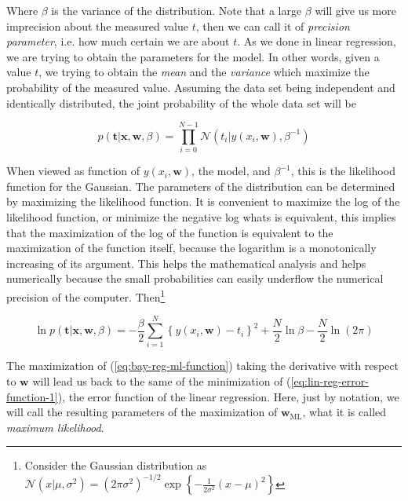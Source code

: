 \documentclass[11pt]{article} %
\begin{document}
Where $\beta$ is the variance of the distribution. Note that a large $\beta$ will give us more imprecision about the measured value $t$, then we can call it of \textit{precision parameter}, i.e. how much certain we are about $t$. As we done in linear regression, we are trying to obtain the parameters for the model. In other words, given a value $t$, we trying to obtain the \textit{mean} and the \textit{variance} which maximize the probability of the measured value. Assuming the data set being independent and identically distributed, the joint probability of the whole data set will be

\begin{equation}
   p(\mathbf{t} | \mathbf{x}, \mathbf{w}, \beta)= \prod_{i=0}^{N-1} \mathcal{N}\left(t_i | y(x_i, \mathbf{w}), \beta^{-1}\right)
\end{equation}

When viewed as function of $y(x_i, \mathbf{w})$, the model, and $\beta^{-1}$, this is the likelihood function for the Gaussian. The parameters of the distribution can be determined by maximizing the likelihood function. It is convenient to maximize the log of the likelihood function, or minimize the negative log whats is equivalent, this implies that the maximization of the log of the function is equivalent to the maximization of the function itself, because the logarithm is a monotonically increasing of its argument. This helps the mathematical analysis and helps numerically because the small probabilities can easily underflow the numerical precision of the computer. Then\footnote[2]{Consider the Gaussian distribution as $\mathcal{N}\left(x | \mu, \sigma^{2}\right)=\left(2 \pi \sigma^{2}\right)^{-1 / 2} \exp \left\{-\frac{1}{2 \sigma^{2}}(x-\mu)^{2}\right\}$}

\begin{equation}
   \label{eq:bay-reg-ml-function}
   \ln p(\mathbf{t} | \mathbf{x}, \mathbf{w}, \beta)=-\frac{\beta}{2} \sum_{i=1}^{N}\left\{y\left(x_{i}, \mathbf{w}\right)-t_{i}\right\}^{2}+\frac{N}{2} \ln \beta-\frac{N}{2} \ln (2 \pi)
\end{equation}

The maximization of (\ref{eq:bay-reg-ml-function}) taking the derivative with respect to $\mathbf{w}$ will lead us back to 
the same of the minimization of (\ref{eq:lin-reg-error-function-1}), the error function of the linear regression. Here, just by notation, we will call the resulting parameters of the maximization of $\mathbf{w}_{\text{ML}}$, what it is called \textit{maximum likelihood}.
\end{document}
